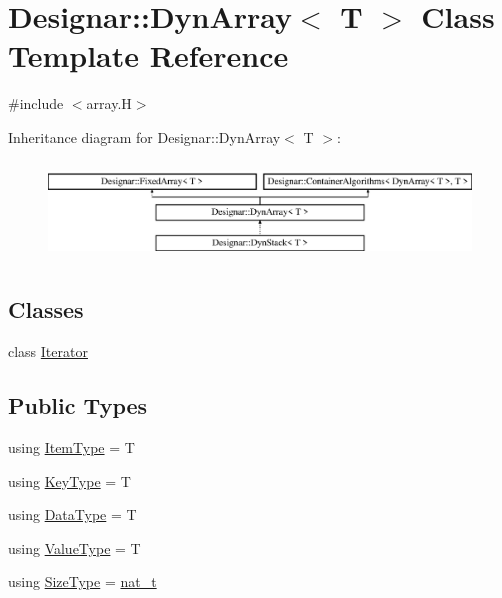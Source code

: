 \hypertarget{class_designar_1_1_dyn_array}{}\section{Designar\+:\+:Dyn\+Array$<$ T $>$ Class Template Reference}
\label{class_designar_1_1_dyn_array}


{\ttfamily \#include $<$array.\+H$>$}

Inheritance diagram for Designar\+:\+:Dyn\+Array$<$ T $>$\+:\begin{figure}[H]
\begin{center}
\leavevmode
\includegraphics[height=2.641510cm]{class_designar_1_1_dyn_array}
\end{center}
\end{figure}
\subsection*{Classes}
\begin{DoxyCompactItemize}
\item 
class \hyperlink{class_designar_1_1_dyn_array_1_1_iterator}{Iterator}
\end{DoxyCompactItemize}
\subsection*{Public Types}
\begin{DoxyCompactItemize}
\item 
using \hyperlink{class_designar_1_1_dyn_array_af4ff8919b3ae0778aa749130ee0e35f7}{Item\+Type} = T
\item 
using \hyperlink{class_designar_1_1_dyn_array_a80080a85ac9ccbe95c17bc0c665e70b4}{Key\+Type} = T
\item 
using \hyperlink{class_designar_1_1_dyn_array_aa683f9cc296f4597784541837e234d83}{Data\+Type} = T
\item 
using \hyperlink{class_designar_1_1_dyn_array_a1df36ad5f778935dcd565138afc155a4}{Value\+Type} = T
\item 
using \hyperlink{class_designar_1_1_dyn_array_a830e5247348d7d54c65d25f77ecc74bb}{Size\+Type} = \hyperlink{namespace_designar_aa72662848b9f4815e7bf31a7cf3e33d1}{nat\+\_\+t}
\end{DoxyCompactItemize}
